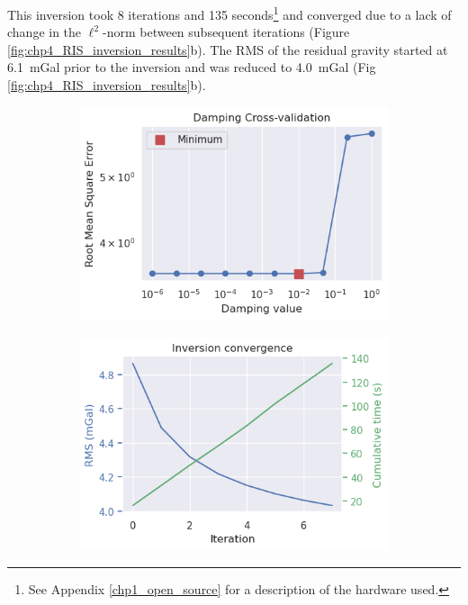 This inversion took 8 iterations and 135 seconds\footnote{See Appendix \ref{chp1_open_source} for a description of the hardware used.} and converged due to a lack of change in the $\ell^2$-norm between subsequent iterations (Figure \ref{fig:chp4_RIS_inversion_results}b). The RMS of the residual gravity started at 6.1~mGal prior to the inversion and was reduced to 4.0~mGal (Fig \ref{fig:chp4_RIS_inversion_results}b). \\

\begin{figure}[!ht]
  \centering
    \begin{subfigure}[t]{.4\textwidth}
        \centering
        \includegraphics[width=\textwidth]{figures/chp4/RIS_damping_CV.png}
        \caption{}
    \end{subfigure}
    \begin{subfigure}[t]{.4\textwidth}
        \centering
        \includegraphics[width=\textwidth]{figures/chp4/RIS_convergence.png}

\end{subfigure}
\end{figure}
